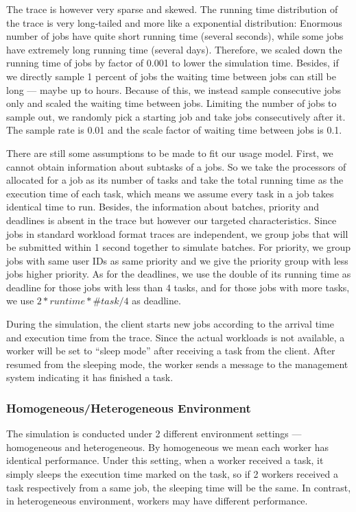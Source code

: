 The trace is however very sparse and skewed.
The running time distribution of the trace is very long-tailed and more
like a exponential distribution: Enormous number of jobs have quite
short running time (several seconds), while some jobs have extremely
long running time (several days).
Therefore, we scaled down the running time of jobs by factor of 0.001 to
lower the simulation time.
Besides, if we directly sample 1 percent of jobs the waiting time
between jobs can still be long --- maybe up to hours.
Because of this, we instead sample consecutive jobs only and scaled the
waiting time between jobs.
Limiting the number of jobs to sample out, we randomly pick a starting
job and take jobs consecutively after it.
The sample rate is 0.01 and the scale factor of waiting time between
jobs is 0.1.

There are still some assumptions to be made to fit our usage model.
First, we cannot obtain information about subtasks of a jobs.
So we take the processors of allocated for a job as its number of tasks
and take the total running time as the execution time of each task,
which means we assume every task in a job takes identical time to run.
Besides, the information about batches, priority and deadlines is absent
in the trace but however our targeted characteristics.
Since jobs in standard workload format traces are independent, we group
jobs that will be submitted within 1 second together to simulate
batches.
For priority, we group jobs with same user IDs as same priority and we
give the priority group with less jobs higher priority.
As for the deadlines, we use the double of its running time as deadline
for those jobs with less than 4 tasks, and for those jobs with more
tasks, we use $2 * runtime * \#task / 4$ as deadline.

During the simulation, the client starts new jobs according to the
arrival time and execution time from the trace.
Since the actual workloads is not available, a worker will be set to
``sleep mode'' after receiving a task from the client.
After resumed from the sleeping mode, the worker sends a message to the
management system indicating it has finished a task.

\subsubsection{Homogeneous/Heterogeneous Environment}

The simulation is conducted under 2 different environment settings ---
homogeneous and heterogeneous.
By homogeneous we mean each worker has identical performance.
Under this setting, when a worker received a task, it simply sleeps the
execution time marked on the task, so if 2 workers received a task
respectively from a same job, the sleeping time will be the same.
In contrast, in heterogeneous environment, workers may have different
performance.

